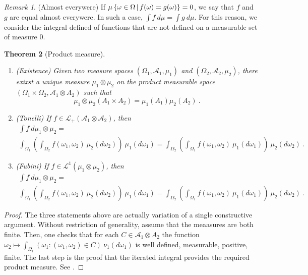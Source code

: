 \documentclass[12pt,a4paper]{amsart}
\theoremstyle{plain}
\newtheorem{theorem}{Theorem}%
\theoremstyle{definition}
\theoremstyle{remark}
\newtheorem{remark}[theorem]{Remark}
\begin{document}
\begin{remark}(Almost everywere) If $\mu\left\{\omega \in
    \Omega \, \middle| \, f(\omega) = g(\omega) \right\} = 0$, we say that $f$ and $g$ are
  equal almost everywere. In such a case, $\int f \ d\mu = \int g \
  d\mu$. For this reason, we consider the integral defined of
  functions that are not defined on a measurable set of measure 0.  
\end{remark}

\begin{theorem}[Product measure]\
  \begin{enumerate}
  \item (\emph{Existence)} Given two measure spaces $(\Omega_1,\mathcal A_1,\mu_1)$ and
    $(\Omega_2,\mathcal A_2,\mu_2)$, there exixst a unique 
    measure $\mu_1 \otimes \mu_2$ on the product measurable space
    $(\Omega_1 \times \Omega_2, \mathcal A_1 \otimes A_2)$ such that
    \begin{equation*}
      \mu_1 \otimes \mu_2 (A_1 \times A_2) = \mu_1(A_1) \mu_2(A_2) \ .
    \end{equation*}
\item (\emph{Tonelli}) If $f \in \mathcal L_+(\mathcal A_1 \otimes \mathcal A_2)$, then
  \begin{multline*}
    \int f \ d\mu_1\otimes\mu_2 = \\ \int_{\Omega_1} \left(\int_{\Omega_2}
    f(\omega_1,\omega_2)  \ \mu_2(d\omega_2)\right) \ \mu_1(d\omega_1)
  = \int_{\Omega_2} \left(\int_{\Omega_1}
    f(\omega_1,\omega_2)  \ \mu_1(d\omega_1)\right) \ \mu_2(d\omega_2)
  \ .
  \end{multline*}
\item (\emph{Fubini}) If $f \in \mathcal L^1(\mu_1 \otimes \mu_2)$, then
  \begin{multline*}
    \int f \ d\mu_1\otimes\mu_2 = \\ \int_{\Omega_1} \left(\int_{\Omega_2}
    f(\omega_1,\omega_2)  \ \mu_2(d\omega_2)\right) \ \mu_1(d\omega_1)
  = \int_{\Omega_2} \left(\int_{\Omega_1}
    f(\omega_1,\omega_2)  \ \mu_1(d\omega_1)\right) \ \mu_2(d\omega_2)
  \ .
  \end{multline*}
  \end{enumerate}
\end{theorem}

\begin{proof}
  The three statements above are actually variation of a single
  constructive argument. Without restriction of generality, assume
  that the meaasures are both finite. Then, one checks that for each
  $C \in \mathcal A_1 \otimes A_2$ the function
  $\omega_2 \mapsto \int_{\Omega_1} (\omega_1 \colon
  (\omega_1,\omega_2) \in C) \ \nu_1(d\omega_1)$ is well defined,
  measurable, positive, finite. The last step is the proof that the
  iterated integral provides the required product measure. See
  \cite[Sec. 8.1-9]{rudin:1987-3rd}.
\end{proof}



\end{document}
